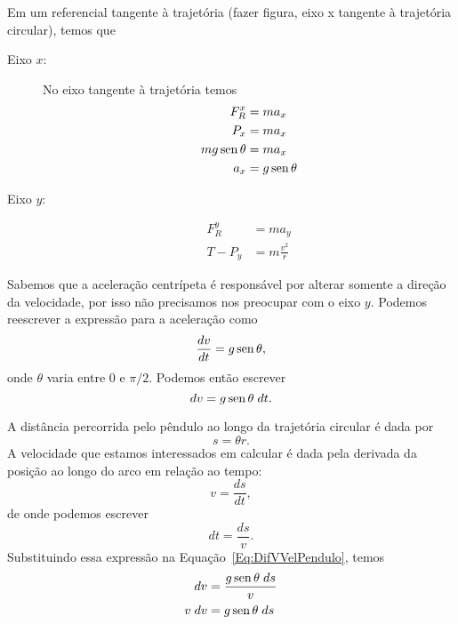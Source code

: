 Em um referencial tangente à trajetória (fazer figura, eixo x tangente à trajetória circular), temos que
\begin{description}
    \item[Eixo $x$:] No eixo tangente à trajetória temos
        \begin{align}
            F_R^x &= m a_x \\
            P_x &= m a_x \\
            mg \operatorname{sen}\theta &= m a_x \\
            a_x &= g \operatorname{sen}\theta
        \end{align}
    \item[Eixo $y$:]
        \begin{align}
            F_R^y &= m a_y \\
            T - P_y &= m \frac{v^2}{r}
        \end{align}
\end{description}
%
Sabemos que a aceleração centrípeta é responsável por alterar somente a direção da velocidade, por isso não precisamos nos preocupar com o eixo $y$. Podemos reescrever a expressão para a aceleração como
\begin{equation}
    \frac{dv}{dt} = g \operatorname{sen}\theta,
\end{equation}
%
onde $\theta$ varia entre 0 e $\pi/2$. Podemos então escrever
\begin{equation}\label{Eq:DifVVelPendulo}
    dv = g\operatorname{sen}\theta \;dt.
\end{equation}

A distância percorrida pelo pêndulo ao longo da trajetória circular é dada por
\begin{equation}
    s = \theta r.
\end{equation}
%
A velocidade que estamos interessados em calcular é dada pela derivada da posição ao longo do arco em relação ao tempo:
\begin{equation}
    v = \frac{ds}{dt},
\end{equation}
%
de onde podemos escrever
\begin{equation}
    dt = \frac{ds}{v}.
\end{equation}
%
Substituindo essa expressão na Equação~\ref{Eq:DifVVelPendulo}, temos
\begin{align}
    dv &= \frac{g \operatorname{sen}\theta \;ds}{v} \\
    v\;dv &=  g \operatorname{sen} \theta \; ds
\end{align}

